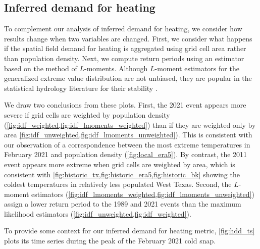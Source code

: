 \documentclass[12pt]{iopart}
\begin{document}
\subsection{Inferred demand for heating}

To complement our analysis of inferred demand for heating, we consider how results change when two variables are changed.
First, we consider what happens if the spatial field demand for heating is aggregated using grid cell area rather than population density.
Next, we compute return periods using an estimator based on the method of $L$-moments.
Although $L$-moment estimators for the generalized extreme value distribution are not unbiased, they are popular in the statistical hydrology literature for their stability \cite{hosking_gev:1985,martins_gev:2001,morrison_gev:2002}.

We draw two conclusions from these plots.
First, the 2021 event appears more severe if grid cells are weighted by population density (\cref{fig:idf_weighted,fig:idf_lmoments_weighted}) than if they are weighted only by area \cref{fig:idf_unweighted,fig:idf_lmoments_unweighted}).
This is consistent with our observation of a correspondence between the most extreme temperatures in February 2021 and population density (\cref{fig:local_era5}).
By contrast, the 2011 event appears more extreme when grid cells are weighted by area, which is consistent with \cref{fig:historic_tx,fig:historic_era5,fig:historic_bk} showing the coldest temperatures in relatively less populated West Texas.
Second, the $L$-moment estimators (\cref{fig:idf_lmoments_weighted,fig:idf_lmoments_unweighted}) assign a lower return period to the 1989 and 2021 events than the maximum likelihood estimators (\cref{fig:idf_unweighted,fig:idf_weighted}).

To provide some context for our inferred demand for heating metric, \cref{fig:hdd_ts} plots its time series during the peak of the February 2021 cold snap.
\end{document}
